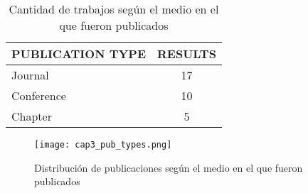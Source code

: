 \begin{table}[H]
  \begin{center}
  \begin{tabular}{| m{4cm} | c |}
    \hline
    PUBLICATION TYPE & RESULTS\\
    \hline
    \hline 
    Journal & 17 \\
    \hline
    Conference & 10 \\
    \hline
    Chapter & 5 \\
    \hline
  \end{tabular}
\end{center}
\caption{Cantidad de trabajos según el medio en el que fueron publicados}
\label{tab:ResumenForumResultados}
\end{table} 

\begin{figure}[H]
  \begin{center}
    \texttt{[image: cap3\_pub\_types.png]}
  \end{center}
  \caption{Distribución de publicaciones según el medio en el que fueron publicados}
  \label{fig:PublicacionesTipos}
\end{figure}

